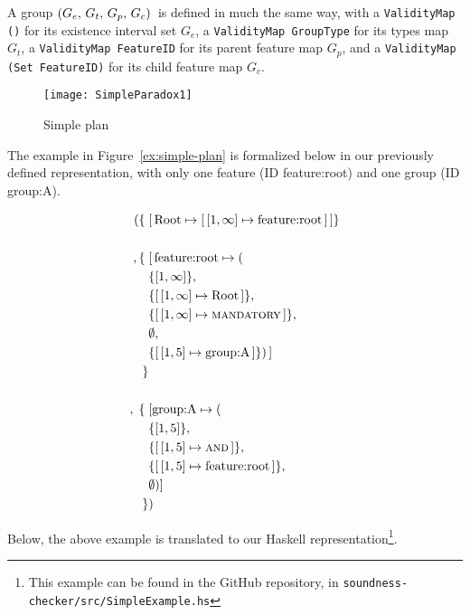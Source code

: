 A group $\left(G_e,\, G_t,\, G_p,\, G_c\right){}$ is defined in much the same way, with a \texttt{Validity\-Map ()} for its existence interval set $G_e$, a \texttt{Validity\-Map Group\-Type} for its types map $G_t$, a \texttt{Validity\-Map Feature\-ID} for its parent feature map $G_p$, and a \texttt{Validity\-Map (Set Feature\-ID)} for its child feature map $G_c$. 

\begin{figure}
   \centering
      \texttt{[image: SimpleParadox1]}
   \caption{Simple plan}
   \label{ex:simple-plan}
\end{figure}

The example in Figure~\vref{ex:simple-plan} is formalized below in our previously defined representation, with only one feature (ID feature:root) and one group (ID group:A).

\begin{align*}
 ( \{ \; & \mapping{\text{Root}}{\intervalmapping{1}{\forever}{\text{feature:root}}} \} \\
    \\
    ,\{\; & \mapping{\text{feature:root}}{( \\
          & \{ \interval{1}{\forever}\} ,\, \\
          & \{\intervalmapping{1}{\forever}{\text{Root}}\} ,\, \\
          & \{\intervalmapping{1}{\forever}{\mandatory{}}\} ,\, \\
          &  \emptyset ,\, \\ 
          & \{\intervalmapping{1}{5}{\text{group:A}}\} ) } \\
       \} &\\
          \\
            ,\; \{ \; & [ \text{group:A} \mapsto ( \\
                      & \{\interval{1}{5}\} ,\, \\
                      & \{\intervalmapping{1}{5}{\andtype{}}\} ,\, \\
                      & \{\intervalmapping{1}{5}{\text{feature:root}}\} ,\, \\
                      & \emptyset ) ]\\
 \}&)\\
\end{align*}

Below, the above example is translated to our Haskell representation\footnote{This example can be found in the GitHub repository, in \texttt{soundness-checker/\allowbreak src/\allowbreak SimpleExample.hs}}.

